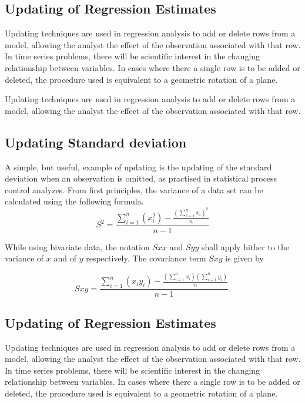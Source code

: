 \documentclass[12pt, a4paper]{article}
\begin{document}
\subsection{Updating of Regression Estimates}
Updating techniques are used in regression analysis to add or delete rows from a model, allowing the analyst the effect of the observation associated with that row. In time series problems, there will be scientific interest in the changing relationship between variables. In cases where there a single row is to be added or deleted, the procedure used is equivalent to a geometric rotation of a plane.

Updating techniques are used in regression analysis to add or delete rows from a model, allowing the analyst the effect of the observation associated with that row.

\subsection{Updating Standard deviation}
A simple, but useful, example of updating is the updating of the standard deviation when an observation is omitted, as practised in statistical process control analyzes. From first principles, the variance of a data set can be calculated using the following formula.
\begin{equation}
S^{2}=\frac{\sum_{i=1}^{n}(x_{i}^{2})-\frac{(\sum_{i=1}^{n}x_{i})^{2}}{n}}{n-1}
\end{equation}

While using bivariate data, the notation $Sxx$ and $Syy$ shall apply hither to the variance of $x$ and of $y$ respectively. The covariance term $Sxy$ is given by

\begin{equation}
Sxy=\frac{\sum_{i=1}^{n}(x_{i}y_{i})-\frac{(\sum_{i=1}^{n}x_{i})(\sum_{i=1}^{n}y_{i})}{n}}{n-1}.
\end{equation}

\subsection{Updating of Regression Estimates}
Updating techniques are used in regression analysis to add or
delete rows from a model, allowing the analyst the effect of the
observation associated with that row. In time series problems,
there will be scientific interest in the changing relationship
between variables. In cases where there a single row is to be
added or deleted, the procedure used is equivalent to a geometric
rotation of a plane.
\end{document}
